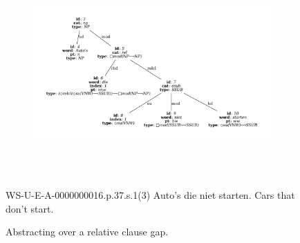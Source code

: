 \begin{figure}
	\begin{subfigure}{1\textwidth}
		\includegraphics[width=1\textwidth, trim={1.5cm 1.5cm 1.5cm 1.5cm}]{./prebuilt/simple_abstraction.pdf}\\[\smallsep]
	\end{subfigure}\\[\midsep]
	\begin{subfigure}{1\textwidth}
	\end{subfigure}\\[\smallsep]
	\aethelcap
		{WS-U-E-A-0000000016.p.37.s.1(3)}
		{Auto's die niet starten.}
		{Cars that don't start.}
		{}
	\caption{Abstracting over a relative clause gap.}
	\label{figure:simple_abstraction}
\end{figure}

